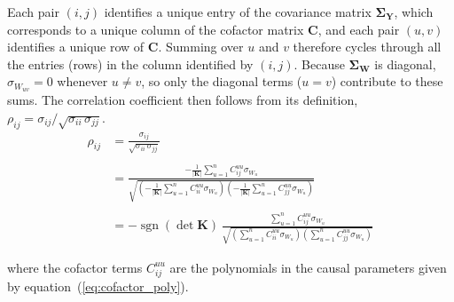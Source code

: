 \documentclass{article}
\begin{document}
Each pair $(i,j)$ identifies a unique entry of the covariance matrix $\mathbf{\Sigma_Y}$, which corresponds to a unique column of the cofactor matrix $\mathbf{C}$, and each pair $(u,v)$ identifies a unique row of $\mathbf{C}$. Summing over $u$ and $v$ therefore cycles through all the entries (rows) in the column identified by $(i,j)$. Because $\mathbf{\Sigma_W}$ is diagonal, $\sigma_{W_{uv}}=0$ whenever $u \neq v$, so only the diagonal terms ($u=v$) contribute to these sums. The correlation coefficient then follows from its definition, $\rho_{ij}=\sigma_{ij}/\sqrt{\sigma_{ii}\,\sigma_{jj}}$. 
\begin{equation}
\begin{aligned}
\rho_{ij} &=\frac{\sigma_{ij}}{\sqrt{\sigma_{ii}\,\sigma_{jj}}} \\
\\
&=\frac{- \frac{1}{|\mathbf{K}|}\sum_{u=1}^{n} C_{ij}^{uu} \sigma_{W_{u}}}{\sqrt{\left(- \frac{1}{|\mathbf{K}|}\sum_{u=1}^{n} C_{ii}^{uu} \sigma_{W_{u}}\right)\left(- \frac{1}{|\mathbf{K}|}\sum_{u=1}^{n} C_{jj}^{uu} \sigma_{W_{u}}\right)}} \\
\\
&=-\operatorname{sgn}(\det \mathbf{K})\, \frac{ \sum_{u=1}^{n} C_{ij}^{uu} \sigma_{W_{u}}}{\sqrt{\left( \sum_{u=1}^{n} C_{ii}^{uu} \sigma_{W_{u}}\right)\left( \sum_{u=1}^{n} C_{jj}^{uu} \sigma_{W_{u}}\right)}}
\end{aligned}
\label{eq:rho_ij_nbyn}
\end{equation}

where the cofactor terms $C_{ij}^{uu}$ are the polynomials in the causal parameters given by equation~(\ref{eq:cofactor_poly}).







\end{document}
